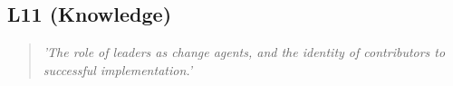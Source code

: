 \subsection*{L11 (Knowledge)}

  \begin{quote}
    \textit{'The role of leaders as change agents,
    and the identity of contributors to successful
    implementation.'}
  \end{quote}

\newpage